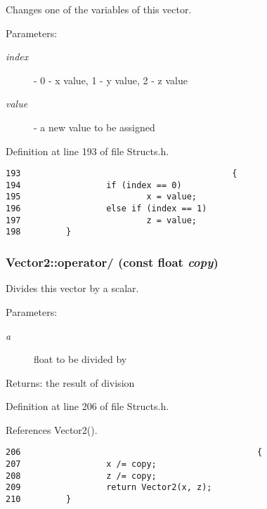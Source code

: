 Changes one of the variables of this vector. 

\begin{Desc}
\item[Parameters:]
\begin{description}
\item[{\em index}]- 0 - x value, 1 - y value, 2 - z value \item[{\em value}]- a new value to be assigned \end{description}
\end{Desc}


Definition at line 193 of file Structs.h.

\begin{Code}\begin{verbatim}193                                          {
194                 if (index == 0)
195                         x = value;
196                 else if (index == 1)
197                         z = value;
198         }
\end{verbatim}
\end{Code}


\hypertarget{struct_vector2_4a047a7b72a15bc98eeb90f84bec1069}{
\subsubsection[operator/]{ Vector2::operator/ (const float {\em copy})}}
\label{struct_vector2_4a047a7b72a15bc98eeb90f84bec1069}


Divides this vector by a scalar. 

\begin{Desc}
\item[Parameters:]
\begin{description}
\item[{\em a}]float to be divided by \end{description}
\end{Desc}
\begin{Desc}
\item[Returns:]the result of division \end{Desc}


Definition at line 206 of file Structs.h.

References Vector2().

\begin{Code}\begin{verbatim}206                                               {
207                 x /= copy;
208                 z /= copy;
209                 return Vector2(x, z);
210         }
\end{verbatim}
\end{Code}




